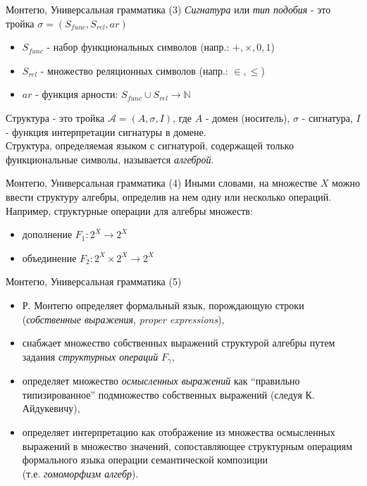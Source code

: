\documentclass{beamer}
\begin{document}
\begin{frame}{Монтегю, Универсальная грамматика (3)}
\textit{Сигнатура} или \textit{тип подобия} - это тройка $\sigma = (S_{func}, S_{rel}, ar)$\\
\bigskip
\begin{itemize}
  \item $S_{func}$ - набор функциональных символов (напр.: $+, \times, 0, 1$)
  \item $S_{rel}$ - множество реляционных символов (напр.: $\in, \leq$)
  \item $ar$ - функция арности: $S_{func} \cup S_{rel} \to \mathbb{N}$
\end{itemize}
\bigskip
Структура - это тройка $\mathcal{A} = (A, \sigma, I)$, где $A$ - домен (носитель), $\sigma$ - сигнатура, $I$ - функция интерпретации сигнатуры в домене.\\
\bigskip
Структура, определяемая языком с сигнатурой, содержащей только функциональные символы, называется \textit{алгеброй}.
\end{frame}

\begin{frame}{Монтегю, Универсальная грамматика (4)}
Иными словами, на множестве $X$ можно ввести структуру алгебры, определив на нем одну или несколько операций.\\
\bigskip
Например, структурные операции для алгебры множеств:
\begin{itemize}
  \item дополнение $F_1 : 2^X \to 2^X$
  \item объединение $F_2 : 2^X \times 2^X \to 2^X$ 
\end{itemize}
\end{frame}

\begin{frame}{Монтегю, Универсальная грамматика (5)}
\begin{itemize}
  \item Р. Монтегю определяет формальный язык, порождающую строки (\textit{собственные выражения}, \textit{proper expressions}),
  \item снабжает множество собственных выражений структурой алгебры путем задания \textit{структурных операций} $F_\gamma$,
  \item определяет множество \textit{осмысленных выражений} как ``правильно типизированное'' подмножество собственных выражений (следуя К. Айдукевичу),
  \item определяет интерпретацию как отображение из множества осмысленных выражений в множество значений, сопоставляющее структурным операциям формального языка операции семантической композиции\\ (т.е. \textit{гомоморфизм алгебр}).
\end{itemize}
\end{frame}
\end{document}
